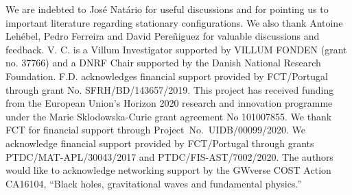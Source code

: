 \documentclass[twocolumn,preprintnumbers,nofootinbib,prd,superscriptaddress,aps]{revtex4-1}
\begin{document}
We are indebted to José Natário for useful discussions and for pointing us to important literature regarding stationary configurations. We also thank Antoine Lehébel, Pedro Ferreira and David Pereñiguez for valuable discussions and feedback.
%
V. C. is a Villum Investigator supported by VILLUM FONDEN (grant no. 37766) and a DNRF Chair supported by the Danish National Research Foundation.
%
F.D. acknowledges financial support provided by FCT/Portugal through grant No. SFRH/BD/143657/2019. 
%
This project has received funding from the European Union's Horizon 2020 research and innovation programme under the Marie Sklodowska-Curie grant agreement No 101007855.
%
We thank FCT for financial support through Project~No.~UIDB/00099/2020.
%
We acknowledge financial support provided by FCT/Portugal through grants PTDC/MAT-APL/30043/2017 and PTDC/FIS-AST/7002/2020.
%
The authors would like to acknowledge networking support by the GWverse COST Action 
CA16104, ``Black holes, gravitational waves and fundamental physics.''
%





 
\end{document}
